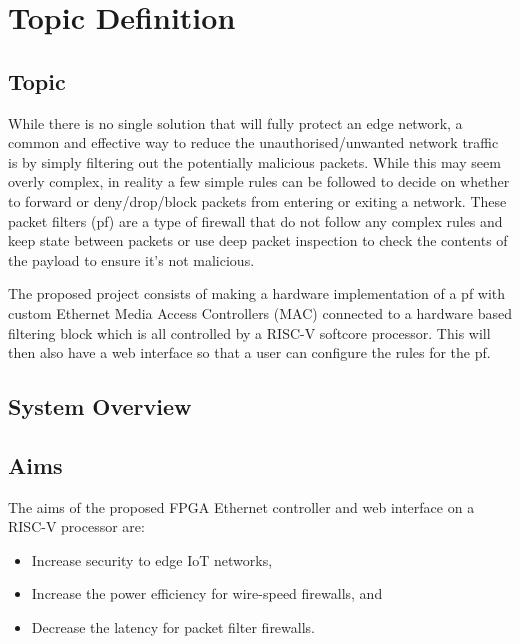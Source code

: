 \chapter[Topic Definition]{Topic Definition}
\label{Chap:label}	%
\pagestyle{headings}


\section{Topic}

While there is no single solution that will fully protect an edge network, a common and effective way to reduce the unauthorised/unwanted network 
traffic is by simply filtering out the potentially malicious packets. While this may seem overly complex, in reality a few simple rules can be followed
to decide on whether to forward or deny/drop/block packets from entering or exiting a network. These packet filters (pf) are a type of firewall that do 
not follow any complex rules and keep state between packets or use deep packet inspection to check the contents of the payload to ensure it's not 
malicious. 

The proposed project consists of making a hardware implementation of a pf with custom Ethernet Media Access Controllers (MAC) connected to a hardware
based filtering block which is all controlled by a RISC-V softcore processor. This will then also have a web interface so that a user can configure
the rules for the pf.

\section{System Overview}



\section{Aims}

The aims of the proposed FPGA Ethernet controller and web interface on a RISC-V processor are:

\begin{itemize}
    \item Increase security to edge IoT networks,
    \item Increase the power efficiency for wire-speed firewalls, and
    \item Decrease the latency for packet filter firewalls.
\end{itemize}



